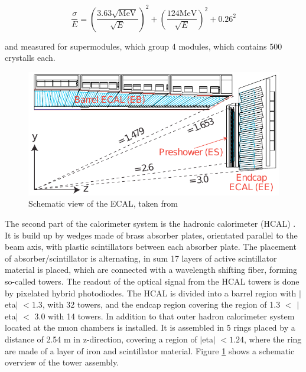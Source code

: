 \begin{equation}
	\label{eq:eq_2_4}
	\frac{\sigma}{E} = (\frac{3.63 \sqrt{\text{MeV}}}{\sqrt{E}})^2 + (\frac{124 \text{MeV}}{\sqrt{E}})^2 + 0.26^{2}
\end{equation}

and measured for supermodules, which group 4 modules, which contains 500 crystalls each. \\

\begin{figure}[ht]
	\centering
	\includegraphics[width=1\textwidth]{pictures/CMS_ElectromagneticCalorimeter.pdf}

	\caption[Electromagnetic calorimeter of CMS]{Schematic view of the \gls{ECAL}, taken from \cite{CMS2}}
	\label{fig:fig_2_8}
\end{figure}

The second part of the calorimeter system is the hadronic calorimeter (\gls{HCAL}) \cite{CMS2, HCAL}. It is build up by wedges made of brass absorber plates, orientated parallel to the beam axis, with plastic scintillators between each absorber plate. The placement of absorber/scintillator is alternating, in sum 17 layers of active scintillator material is placed, which are connected with a wavelength shifting fiber, forming so-called towers. The readout of the optical signal from the HCAL towers is done by pixelated hybrid photodiodes. The \gls{HCAL} is divided into a barrel region with $|$\gls{eta}$|$ $< 1.3$, with 32 towers, and the endcap region covering the region of 1.3 $<$ $|$\gls{eta}$|$ $<$ 3.0 with 14 towers. In addition to that outer hadron calorimeter system located at the muon chambers is installed. It is assembled in 5 rings placed by a distance of 2.54 m in z-direction, covering a region of $|$\gls{eta}$|$ $< 1.24$, where the ring are made of a layer of iron and scintillator material. Figure \ref{fig:fig_2_8} shows a schematic overview of the tower assembly. \\

